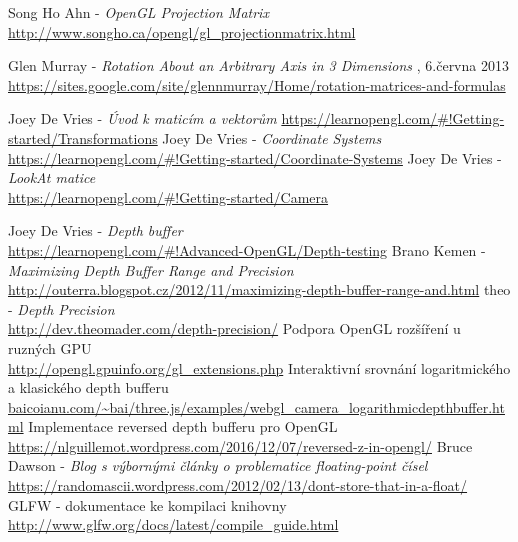  \begin{thebibliography}{1}
		  Song Ho Ahn - { \em OpenGL Projection Matrix}\\ \url{http://www.songho.ca/opengl/gl_projectionmatrix.html}
		
		  Glen Murray - {\em Rotation About an Arbitrary Axis in 3 Dimensions} , 6.června 2013\\
		\url{https://sites.google.com/site/glennmurray/Home/rotation-matrices-and-formulas}
		
		 Joey De Vries - {\em Úvod k maticím a vektorům}
		\url{https://learnopengl.com/#!Getting-started/Transformations}
		 Joey De Vries - {\em Coordinate Systems}\\
		\url{https://learnopengl.com/#!Getting-started/Coordinate-Systems}
		 Joey De Vries - {\em LookAt matice}\\
		\url{https://learnopengl.com/#!Getting-started/Camera}
		
		 Joey De Vries - {\em Depth buffer}\\
		\url{https://learnopengl.com/#!Advanced-OpenGL/Depth-testing}
		  Brano Kemen - {\em Maximizing Depth Buffer Range and Precision}\\
		\url{http://outerra.blogspot.cz/2012/11/maximizing-depth-buffer-range-and.html}
		 theo -  { \em Depth Precision}\\
		\url{http://dev.theomader.com/depth-precision/}
		 Podpora OpenGL rozšíření u ruzných GPU\\
		\url{http://opengl.gpuinfo.org/gl\_extensions.php}
		 Interaktivní srovnání logaritmického a klasického depth bufferu\\
		\url{baicoianu.com/~bai/three.js/examples/webgl_camera_logarithmicdepthbuffer.html}
		 Implementace reversed depth bufferu pro OpenGL\\
		\url{https://nlguillemot.wordpress.com/2016/12/07/reversed-z-in-opengl/}
		 Bruce Dawson - { \em Blog s výbornými články o problematice floating-point čísel}\\
		\url{https://randomascii.wordpress.com/2012/02/13/dont-store-that-in-a-float/}
		 GLFW - dokumentace ke kompilaci knihovny
		\url{http://www.glfw.org/docs/latest/compile_guide.html}
	\end{thebibliography}